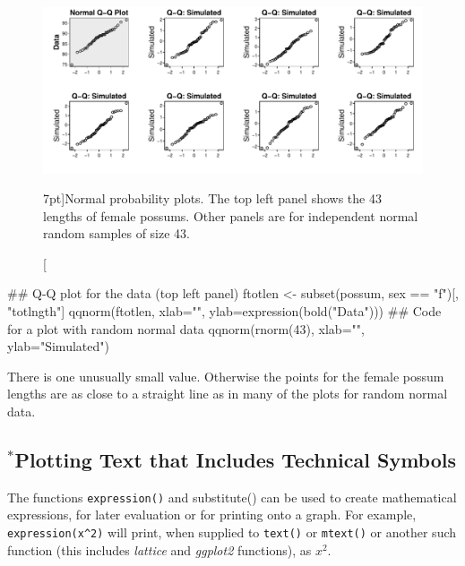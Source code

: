 \documentclass{tufte-book}\usepackage[]{graphicx}\usepackage[]{color}
\newcommand{\txtt}[1]{\texttt{#1}}
\begin{document}
\begin{figure}
\begin{Schunk}


\centerline{\includegraphics[width=\textwidth]{figs/09-possum-qqn-1} }

\end{Schunk}
 \caption[][7pt]{Normal probability plots. The top left panel
   shows the 43 lengths
of female possums. Other panels are for independent normal
random samples of size 43.\label{fig:np-plots}}
\vspace*{-24pt}

\end{figure}

\begin{Schunk}
\begin{Sinput}
## Q-Q plot for the data (top left panel)
ftotlen <- subset(possum, sex == "f")[, "totlngth"]
qqnorm(ftotlen, xlab="",
       ylab=expression(bold("Data")))
## Code for a plot with random normal data
qqnorm(rnorm(43), xlab="", ylab="Simulated")
\end{Sinput}
\end{Schunk}

\noindent There is one unusually small value.  Otherwise the points
for the female possum lengths are as close to a straight line as in
many of the plots for random normal data.

\subsection{$^*$Plotting Text that Includes Technical  Symbols}\label{sec:mathvec}

The functions \txtt{expression()} and {substitute()} can be used
to create mathematical expressions, for later evaluation or for
printing onto a graph.  For example, \verb+expression(x^2)+ will
print, when supplied to \txtt{text()} or \txtt{mtext()} or another
such function (this includes {\em lattice} and {\em ggplot2} functions),
as $x^2$.
\end{document}

